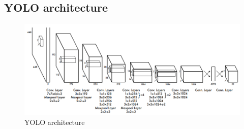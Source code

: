 \subsection{YOLO architecture}
\begin{figure}[h]
	\includegraphics[width=\linewidth]{Res/Immagini/yoloArch.PNG}	
	\caption{YOLO architecture}
\end{figure}
